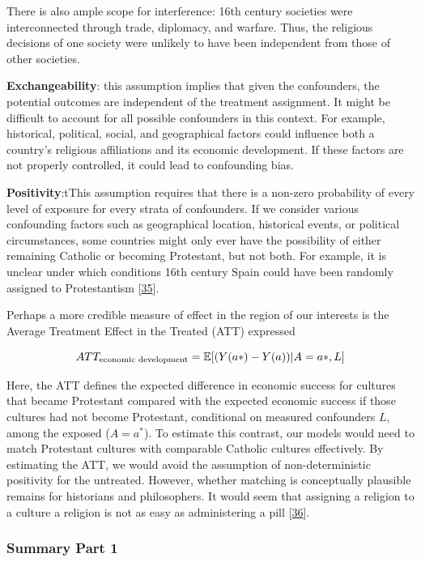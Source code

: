 \documentclass[
  singlecolumn]{article}
\begin{document}
There is also ample scope for interference: 16th century societies were
interconnected through trade, diplomacy, and warfare. Thus, the
religious decisions of one society were unlikely to have been
independent from those of other societies.

\textbf{Exchangeability}: this assumption implies that given the
confounders, the potential outcomes are independent of the treatment
assignment. It might be difficult to account for all possible
confounders in this context. For example, historical, political, social,
and geographical factors could influence both a country's religious
affiliations and its economic development. If these factors are not
properly controlled, it could lead to confounding bias.

\textbf{Positivity}:tThis assumption requires that there is a non-zero
probability of every level of exposure for every strata of confounders.
If we consider various confounding factors such as geographical
location, historical events, or political circumstances, some countries
might only ever have the possibility of either remaining Catholic or
becoming Protestant, but not both. For example, it is unclear under
which conditions 16th century Spain could have been randomly assigned to
Protestantism {[}\protect\hyperlink{ref-nalle1987}{35}{]}.

Perhaps a more credible measure of effect in the region of our interests
is the Average Treatment Effect in the Treated (ATT) expressed

\[ATT_{\textnormal{economic~development}} = \mathbb{E}[(Y(a*)- Y(a))|A = a*,L]\]

Here, the ATT defines the expected difference in economic success for
cultures that became Protestant compared with the expected economic
success if those cultures had not become Protestant, conditional on
measured confounders \(L\), among the exposed (\(A = a^*\)). To estimate
this contrast, our models would need to match Protestant cultures with
comparable Catholic cultures effectively. By estimating the ATT, we
would avoid the assumption of non-deterministic positivity for the
untreated. However, whether matching is conceptually plausible remains
for historians and philosophers. It would seem that assigning a religion
to a culture a religion is not as easy as administering a pill
{[}\protect\hyperlink{ref-watts2018}{36}{]}.

\hypertarget{summary-part-1}{%
\subsubsection{Summary Part 1}\label{summary-part-1}}
\end{document}
